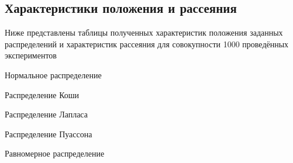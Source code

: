 \subsection{Характеристики положения и рассеяния}
Ниже представлены таблицы полученных характеристик положения заданных распределений и характеристик рассеяния для совокупности 1000 проведённых экспериментов

\begin{table}[H]
	\begin{center}
		
		\caption{Нормальное распределение}
		\label{tabl:tabl_name}
	\end{center}
\end{table}

\begin{table}[H]
	\begin{center}
		
		\caption{Распределение Коши}
		\label{tabl:tabl_name}
	\end{center}
\end{table}

\begin{table}[H]
	\begin{center}
		
		\caption{Распределение Лапласа}
		\label{tabl:tabl_name}
	\end{center}
\end{table}

\begin{table}[H]
	\begin{center}
		
		\caption{Распределение Пуассона}
		\label{tabl:tabl_name}
	\end{center}
\end{table}

\begin{table}[H]
	\begin{center}
		
		\caption{Равномерное распределение}
		\label{tabl:tabl_name}
	\end{center}
\end{table}
